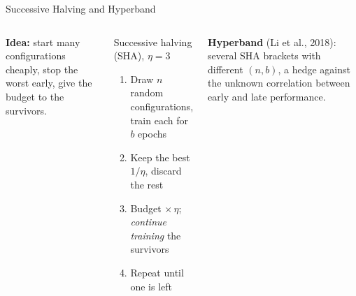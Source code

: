 \documentclass[aspectratio=169,11pt]{beamer}
\newcommand{\emphc}[1]{\textcolor{harvardcrimson}{#1}}
\begin{document}
\begin{frame}{Successive Halving and Hyperband}
\begin{columns}[T]
\footnotesize
\textbf{Idea:} start many configurations cheaply, \emphc{stop the worst early}, give the budget to the survivors.

\vspace{0.05cm}
\begin{block}{Successive halving (SHA), $\eta=3$}
\begin{enumerate}\itemsep0pt
    \item Draw $n$ random configurations, train each for $b$ epochs
    \item Keep the best $1/\eta$, discard the rest
    \item Budget $\times\,\eta$; \emph{continue training} the survivors
    \item Repeat until one is left
\end{enumerate}
\end{block}

\vspace{0.05cm}
\textbf{Hyperband} (Li et al., 2018): several SHA brackets with different $(n, b)$, a hedge
against the unknown correlation between early and late performance.


\end{columns}
\end{frame}
\end{document}
